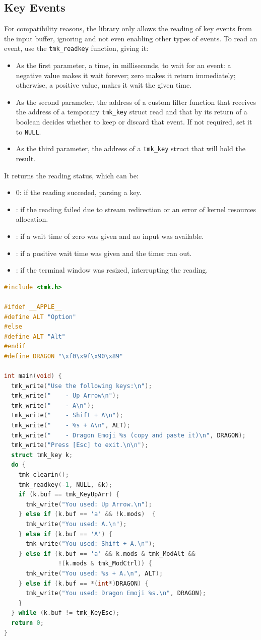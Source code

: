 \documentclass{report}
\begin{document}
\subsection{Key Events}
For compatibility reasons, the library only allows the reading of key events from the input buffer, ignoring and not even enabling other types of events. To read an event, use the \texttt{tmk\_readkey} function, giving it:
\begin{itemize}
  \item As the first parameter, a time, in milliseconds, to wait for an event: a negative value makes it wait forever; zero makes it return immediately; otherwise, a positive value, makes it wait the given time.
  \item As the second parameter, the address of a custom filter function that receives the address of a temporary \texttt{tmk\_key} struct read and that by its return of a boolean decides whether to keep or discard that event. If not required, set it to \texttt{NULL}.
  \item As the third parameter, the address of a \texttt{tmk\_key} struct that will hold the result.
\end{itemize}
It returns the reading status, which can be:
\begin{itemize}
  \item 0: if the reading succeded, parsing a key.
  \item {}: if the reading failed due to stream redirection or an error of kernel resources allocation.
  \item {}: if a wait time of zero was given and no input was available.
  \item {}: if a positive wait time was given and the timer ran out.
  \item {}: if the terminal window was resized, interrupting the reading.
\end{itemize}
\begin{lstlisting}[language=c,caption=an example that parse some keys.]
#include <tmk.h>

#ifdef __APPLE__
#define ALT "Option"
#else
#define ALT "Alt"
#endif
#define DRAGON "\xf0\x9f\x90\x89"

int main(void) {
  tmk_write("Use the following keys:\n");
  tmk_write("    - Up Arrow\n");
  tmk_write("    - A\n");
  tmk_write("    - Shift + A\n");
  tmk_write("    - %s + A\n", ALT);
  tmk_write("    - Dragon Emoji %s (copy and paste it)\n", DRAGON);
  tmk_write("Press [Esc] to exit.\n\n");
  struct tmk_key k;
  do {
    tmk_clearin();
    tmk_readkey(-1, NULL, &k);
    if (k.buf == tmk_KeyUpArr) {
      tmk_write("You used: Up Arrow.\n");
    } else if (k.buf == 'a' && !k.mods)  {
      tmk_write("You used: A.\n");
    } else if (k.buf == 'A') {
      tmk_write("You used: Shift + A.\n");
    } else if (k.buf == 'a' && k.mods & tmk_ModAlt &&
               !(k.mods & tmk_ModCtrl)) {
      tmk_write("You used: %s + A.\n", ALT);
    } else if (k.buf == *(int*)DRAGON) {
      tmk_write("You used: Dragon Emoji %s.\n", DRAGON);
    }
  } while (k.buf != tmk_KeyEsc);
  return 0;
}
\end{lstlisting}
\end{document}
